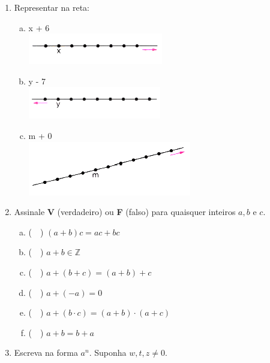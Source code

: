 \documentclass[a4paper,14pt]{article}
\begin{document}
\begin{multicols}{2}
\begin{enumerate}
			\item Representar na reta:
			\begin{enumerate}[a)] 
				\item x + 6 \\
				\includegraphics[width=1\linewidth]{6FMA134_imagens/imagem1}
				\item y - 7 \\
				\includegraphics[width=1\linewidth]{6FMA134_imagens/imagem2}
				\item m + 0 \\
				\includegraphics[width=1\linewidth]{6FMA134_imagens/imagem3}
			\end{enumerate}
			\item Assinale \textbf{V} (verdadeiro) ou \textbf{F} (falso) para quaisquer inteiros $a, b$ e $c$.
			\begin{enumerate}[a)] 
				\item (~~) $(a + b)c = ac + bc$
				\item (~~) $a + b \in \mathbb{Z}$
				\item (~~) $a + (b + c) = (a + b) + c$
				\item (~~) $a + (-a) = 0$
				\item (~~) $a + (b \cdot c) = (a + b) \cdot (a + c)$
				\item (~~) $a + b = b + a$
			\end{enumerate}
			\item Escreva na forma $a^n$. Suponha $w, t, z \neq 0$.

\end{enumerate}
\end{multicols}
\end{document}
